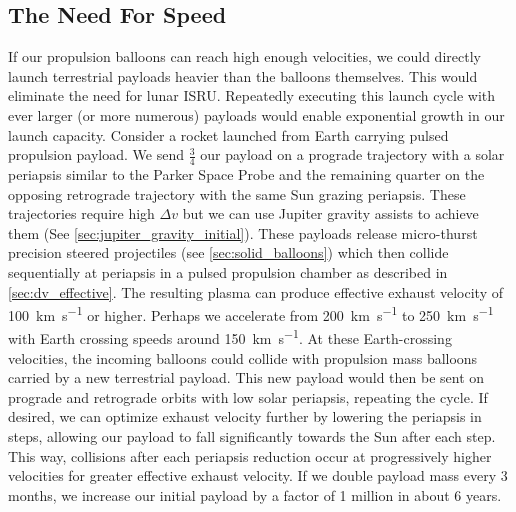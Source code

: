 \documentclass{article}
\begin{document}
{\subsection{The Need For Speed}\label{sec:no_isru_rocket}
If our propulsion balloons can reach high enough velocities, we could directly launch terrestrial payloads heavier than the balloons themselves.   This would eliminate the need for lunar ISRU. Repeatedly executing this launch cycle with ever larger (or more numerous) payloads would enable exponential growth in our launch capacity. Consider a rocket launched from Earth carrying pulsed propulsion payload.   We send $\frac{3}{4}$ our payload on a prograde trajectory with a solar periapsis similar to the Parker Space Probe and the remaining quarter on the opposing retrograde trajectory with the same Sun grazing periapsis.  These trajectories require high $\Delta v$ but we can use Jupiter gravity assists to achieve them (See \autoref{sec:jupiter_gravity_initial}).   These payloads release micro-thurst precision steered projectiles (see \autoref{sec:solid_balloons}) which then collide sequentially at periapsis in a pulsed propulsion chamber as described in \autoref{sec:dv_effective}. The resulting plasma can produce effective exhaust velocity of \SI{100}{\kilo\meter\per\second} or higher. Perhaps we accelerate from \SI{200}{\kilo\meter\per\second} to \SI{250}{\kilo\meter\per\second} with Earth crossing speeds around \SI{150}{\kilo\meter\per\second}.  At these Earth-crossing velocities, the incoming balloons could collide with propulsion mass balloons carried by a new terrestrial payload.  This new payload would then be sent on prograde and retrograde orbits with low solar periapsis, repeating the cycle.  If desired, we can optimize exhaust velocity further by lowering the periapsis in steps, allowing our payload to fall significantly towards the Sun after each step.  This way, collisions after each periapsis reduction occur at progressively higher velocities for greater effective exhaust velocity.   If we double payload mass every 3 months, we increase our initial payload by a factor of 1 million in about 6 years. 

}
\end{document}
